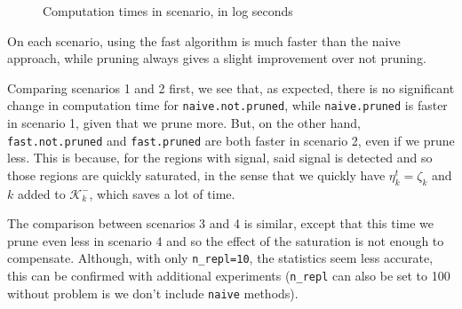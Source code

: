 \documentclass[
  11pt,
  a4paper,
]{article}
\theoremstyle{plain}
\theoremstyle{plain}
\theoremstyle{plain}
\theoremstyle{definition}
\theoremstyle{definition}
\theoremstyle{remark}
\begin{document}
\begin{figure}


\caption{\label{fig-benchmark01}Computation times in scenario, in log
seconds}

\end{figure}%

On each scenario, using the fast algorithm is much faster than the naive
approach, while pruning always gives a slight improvement over not
pruning.

Comparing scenarios 1 and 2 first, we see that, as expected, there is no
significant change in computation time for \texttt{naive.not.pruned},
while \texttt{naive.pruned} is faster in scenario 1, given that we prune
more. But, on the other hand, \texttt{fast.not.pruned} and
\texttt{fast.pruned} are both faster in scenario 2, even if we prune
less. This is because, for the regions with signal, said signal is
detected and so those regions are quickly saturated, in the sense that
we quickly have \(\eta_k^t=\zeta_k\) and \(k\) added to
\(\mathcal{K}^-_k\), which saves a lot of time.

The comparison between scenarios 3 and 4 is similar, except that this
time we prune even less in scenario 4 and so the effect of the
saturation is not enough to compensate. Although, with only
\texttt{n\_repl=10}, the statistics seem less accurate, this can be
confirmed with additional experiments (\texttt{n\_repl} can also be set
to 100 without problem is we don't include \texttt{naive} methods).
\end{document}
